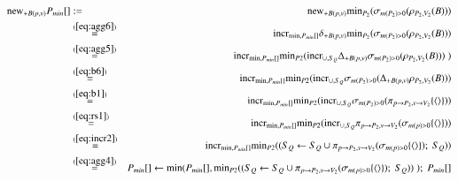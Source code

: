 \documentclass{article}
\newcommand{\tuple}[1]{{\langle#1\rangle}}
\begin{document}
\begin{eqnarray*}
\algnew_{+B(p,v)} P_{min}[] &:=&
\algnew_{+B(p,v)} \algmin_{P_2}(\sigma_{m(P_2) > 0} (\rho_{P_2, V_2}(B)))
\\
&\stackrel{(\ref{eq:agg6})}{=}&
\algincr_{\min, P_{min}[]} \delta_{+B(p,v)} \algmin_{P_2}(\sigma_{m(P_2) >0} (\rho_{P_2, V_2}(B)))
\\
&\stackrel{(\ref{eq:agg5})}{=}&
\algincr_{\min, P_{min}[]} \algmin_{P2} (\algincr_{\cup, S_Q} \Delta_{+B(p,v)} \sigma_{m(P_2) >0} (\rho_{P_2, V_2}(B)))\;)
\\
&\stackrel{(\ref{eq:b6})}{=}&
\algincr_{\min, P_{min}[]} \algmin_{P2} (\algincr_{\cup, S_Q} \sigma_{m(P_2) >0} (\Delta_{+B(p,v)} \rho_{P_2, V_2}(B)))
\\
&\stackrel{(\ref{eq:b1})}{=}&
\algincr_{\min, P_{min}[]} \algmin_{P2} (\algincr_{\cup, S_Q} \sigma_{m(P_2) >0} (\pi_{p \rightarrow P_2, v \rightarrow V_2} \{\tuple{}\}))
\\
&\stackrel{(\ref{eq:rs1})}{=}&
\algincr_{\min, P_{min}[]} \algmin_{P2} (\algincr_{\cup, S_Q} \pi_{p \rightarrow P_2, v \rightarrow V_2} (\sigma_{m(p) >0} \{\tuple{}\}))
\\
&\stackrel{(\ref{eq:incr2})}{=}&
\algincr_{\min, P_{min}[]} \algmin_{P2} ( (S_Q \leftarrow S_Q \cup \pi_{p \rightarrow P_2, v \rightarrow V_2} (\sigma_{m(p) >0} \{\tuple{}\});\;S_Q))
\\
&\stackrel{(\ref{eq:agg4})}{=}&
P_{min}[] \leftarrow \algmin(P_{min}[], \algmin_{P2} ( (S_Q \leftarrow S_Q \cup \pi_{p \rightarrow P_2, v \rightarrow V_2} (\sigma_{m(p) >0} \{\tuple{}\});\;S_Q))\;);\;P_{min}[]
\\
\end{eqnarray*}
\end{document}
